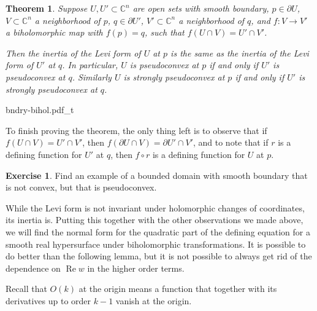\documentclass[12pt,openany]{book}
\renewcommand{\Re}{\operatorname{Re}}
\newcommand{\C}{{\mathbb{C}}}
\newcommand{\myindex}[1]{#1\index{#1}}
\theoremstyle{plain}
\newtheorem{thm}{Theorem}[section]
\theoremstyle{remark}
\theoremstyle{definition}
\newenvironment{exbox}{%
    \def\FrameCommand{\vrule width 1pt \relax\hspace {10pt}}%
    \MakeFramed {\advance \hsize -\width \FrameRestore }%
}{%
    \endMakeFramed
}
\newenvironment{myfig}{%
    \begin{center}
}{%
    \end{center}
}
\theoremstyle{exercise}
\newtheorem{exercise}{Exercise}[section]
\theoremstyle{example}
\begin{document}
\begin{thm}
Suppose $U, U' \subset \C^n$ are open sets with smooth boundary,
$p \in \partial U$, $V \subset \C^n$ a neighborhood of $p$,
$q \in \partial U'$, $V' \subset \C^n$ a neighborhood of $q$,
and $f \colon V \to V'$ a biholomorphic map with $f(p) = q$, such that
$f(U \cap V) = U' \cap V'$.

Then the inertia of the Levi form of $U$ at $p$ is the same as the inertia of
the Levi form of $U'$ at $q$.
In particular, $U$ is pseudoconvex at $p$ if and only if $U'$ is pseudoconvex at $q$.
Similarly
$U$ is strongly pseudoconvex at $p$ if and only if $U'$ is strongly pseudoconvex at $q$.
\end{thm}

\begin{myfig}
{bndry-bihol.pdf_t}
\end{myfig}

To finish proving the theorem, the only thing left is to observe that if
$f(U \cap V) = U' \cap V'$, then $f(\partial U \cap V) = \partial U' \cap
V'$, and to note that if $r$ is a defining function for $U'$ at $q$,
then $f \circ r$ is a defining function for $U$ at $p$.

\begin{exbox}
\begin{exercise}
Find an example of a bounded domain with smooth boundary that is not convex,
but that is pseudoconvex.
\end{exercise}
\end{exbox}

While the Levi form is not invariant under holomorphic changes of coordinates,
its inertia is.
Putting this together with the other observations we made above,
we will find the normal form for the
quadratic part of the defining equation for a smooth real hypersurface
under biholomorphic transformations.
It is possible to do better than the following lemma, but it is not possible
to always get rid of the dependence on $\Re w$ in the higher order terms.

Recall that $O(k)$ at the origin means
a function that together with its derivatives up to order $k-1$ vanish
at the origin.
\end{document}

